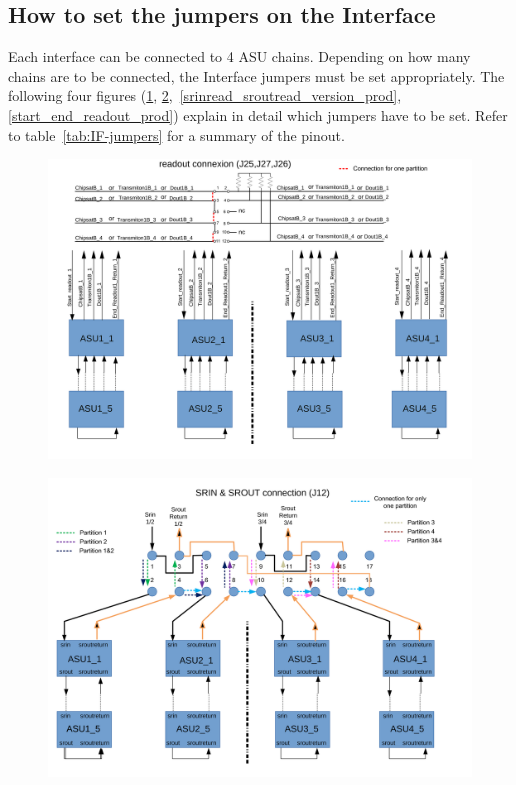 \subsection{How to set the jumpers on the
  Interface}\label{sec:interface-jumpers}
Each interface can be connected to 4 ASU chains. Depending on how many chains
are to be connected, the Interface jumpers must be set appropriately. The
following four figures (\ref{readout_version_prod},
\ref{srin_srout_version_prod},~\ref{srinread_sroutread_version_prod},
\ref{start_end_readout_prod}) explain in detail which jumpers have to be
set. Refer to table~\ref{tab:IF-jumpers} for a summary of the pinout.
\begin{figure}[H] \centering
\includegraphics[width=0.8\linewidth]{readout_version_prod}
  \caption{}\label{readout_version_prod}
\end{figure}
\begin{figure}[H] \centering
\includegraphics[width=0.8\linewidth]{srin_srout_version_prod}
  \caption{}\label{srin_srout_version_prod}
\end{figure}
